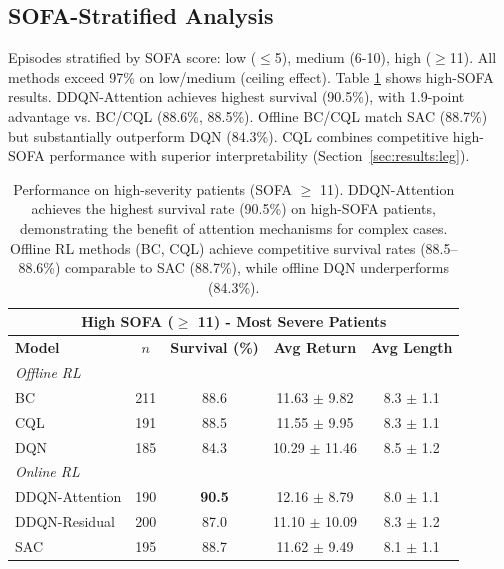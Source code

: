 \subsection{SOFA-Stratified Analysis}\label{sec:results:sofa}

Episodes stratified by SOFA score: low ($\leq$5), medium (6-10), high ($\geq$11). All methods exceed 97\% on low/medium (ceiling effect). Table \ref{tab:sofa-stratified} shows high-SOFA results. DDQN-Attention achieves highest survival (90.5\%), with 1.9-point advantage vs. BC/CQL (88.6\%, 88.5\%). Offline BC/CQL match SAC (88.7\%) but substantially outperform DQN (84.3\%). CQL combines competitive high-SOFA performance with superior interpretability (Section~\ref{sec:results:leg}).

\begin{table}[htbp]
\centering
\caption{Performance on high-severity patients (SOFA $\geq$ 11). DDQN-Attention achieves the highest survival rate (90.5\%) on high-SOFA patients, demonstrating the benefit of attention mechanisms for complex cases. Offline RL methods (BC, CQL) achieve competitive survival rates (88.5--88.6\%) comparable to SAC (88.7\%), while offline DQN underperforms (84.3\%).}
\label{tab:sofa-stratified}
\begin{tabular}{lcccc}
\toprule
\multicolumn{5}{c}{\textbf{High SOFA ($\geq$ 11) - Most Severe Patients}} \\
\midrule
\textbf{Model} & \textbf{$n$} & \textbf{Survival (\%)} & \textbf{Avg Return} & \textbf{Avg Length} \\
\midrule
\multicolumn{5}{l}{\textit{Offline RL}} \\
BC              & 211 & 88.6 & 11.63 $\pm$ 9.82  & 8.3 $\pm$ 1.1 \\
CQL             & 191 & 88.5 & 11.55 $\pm$ 9.95  & 8.3 $\pm$ 1.1 \\
DQN             & 185 & 84.3 & 10.29 $\pm$ 11.46 & 8.5 $\pm$ 1.2 \\
\midrule
\multicolumn{5}{l}{\textit{Online RL}} \\
DDQN-Attention  & 190 & \textbf{90.5} & 12.16 $\pm$ 8.79  & 8.0 $\pm$ 1.1 \\
DDQN-Residual   & 200 & 87.0 & 11.10 $\pm$ 10.09 & 8.3 $\pm$ 1.2 \\
SAC             & 195 & 88.7 & 11.62 $\pm$ 9.49  & 8.1 $\pm$ 1.1 \\
\bottomrule
\end{tabular}
\end{table}


